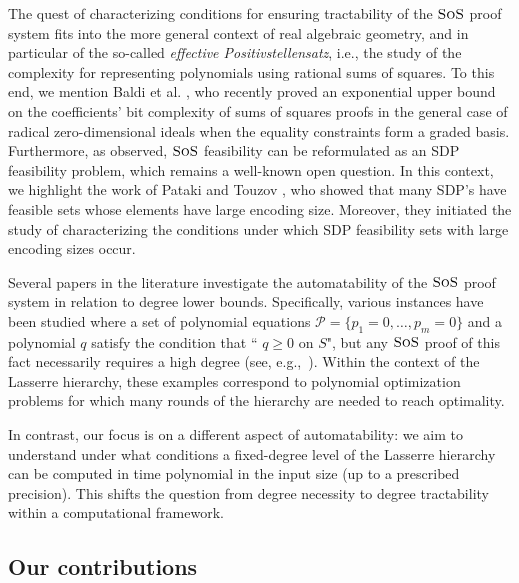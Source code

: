 \documentclass[11pt]{article}
\newcommand{\sos}{\text{\sc{SoS}}}
\newcommand{\1}{\textbf{1}}
\begin{document}
The quest of characterizing conditions for ensuring tractability of the $\sos$ proof system fits into the more general context of real algebraic geometry, and in particular of the so-called \textit{effective Positivstellensatz}, i.e., the study of the complexity for representing polynomials using rational sums of squares. To this end, we mention Baldi et al. \cite{BaldiKM24}, who recently proved an exponential upper bound on the coefficients' bit complexity of sums of squares proofs in the general case of radical zero-dimensional ideals when the equality constraints form a graded basis.
Furthermore, as observed, $\sos$ feasibility can be reformulated as an SDP feasibility problem, which remains a well-known open question.
In this context, we highlight the work of Pataki and Touzov \cite{PatakiT24}, who showed that many SDP's have feasible sets whose elements have large encoding size. Moreover, they initiated the study of characterizing the conditions under which SDP feasibility sets with large encoding sizes occur.


Several papers in the literature investigate the automatability of the $\sos$ proof system in relation to degree lower bounds. Specifically, various instances have been studied where a set of polynomial equations $\mathcal{P} = \{p_1=0, \ldots, p_m=0\}$ and a polynomial $q$ satisfy the condition that `` $q \geq 0$ on $S$", but any $\sos$ proof of this fact necessarily requires a high degree (see, e.g.,~\cite{GrigorievHP_MMJ02,KLM-hard-prob-formulation,KLM-unbounded-SOS-hierarchy-integrality-gap,KLM-tight-SOS-LB-binary-POP,KLM-SOS-hierarchy-LB-symmetric-formulations,potechin:SOS-LB-from-symmetry}). Within the context of the Lasserre hierarchy, these examples correspond to polynomial optimization problems for which many rounds of the hierarchy are needed to reach optimality.

In contrast, our focus is on a different aspect of automatability: we aim to understand under what conditions a fixed-degree level of the Lasserre hierarchy can be computed in time polynomial in the input size (up to a prescribed precision). This shifts the question from degree necessity to degree tractability within a computational framework.


\subsection{Our contributions}\label{sect:contribution}
\end{document}
